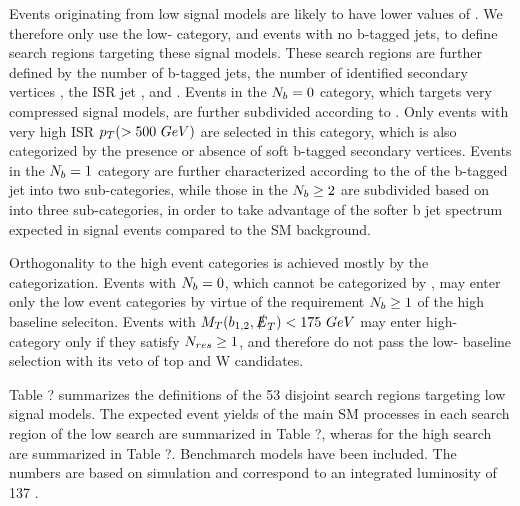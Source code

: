 Events originating from low \dm{} signal models are likely to have lower values of \mtb. We therefore only use the low-\mtb{} category, and events with no b-tagged jets, to define search regions targeting these signal models. These search regions are further defined by the number of b-tagged jets, the number of identified secondary vertices \nsv, the ISR jet \pt, and \met. Events in the $N_{b}=0$ category, which targets very compressed signal models, are further subdivided according to \nj. Only events with very high ISR $p_{T}(>500~GeV)$ are selected in this category, which is also categorized by the presence or absence of soft b-tagged secondary vertices. Events in the $N_{b}=1$ category are further characterized according to the \pt{} of the b-tagged jet into two sub-categories, while those in the $N_{b}\geq2$ are subdivided based on \ptbonetwo{} into three sub-categories, in order to take advantage of the softer b jet \pt{} spectrum expected in signal events compared to the SM background. 

Orthogonality to the high \dm{} event categories is achieved mostly by the \mtb{} categorization. Events with $N_{b}=0$, which cannot be categorized by \mtb, may enter only the low \dm{} event categories by virtue of the requirement $N_{b}\geq1$ of the high \dm{} baseline seleciton. Events with $M_{T}(b_{1,2},\slashed{E}_{T})<175~GeV$ may enter high-\dm{} category only if they satisfy $N_{res}\geq1$, and therefore do not pass the low-\dm{} baseline selection with its veto of top and W candidates. 

Table ? summarizes the definitions of the 53 disjoint search regions targeting low \dm{} signal models. The expected event yields of the main SM processes in each search region of the low \dm{} search are summarized in Table ?, wheras for the high \dm{} search are summarized in Table ?. Benchmarch models have been included. The numbers are based on simulation and correspond to an integrated luminosity of 137 \fb.


